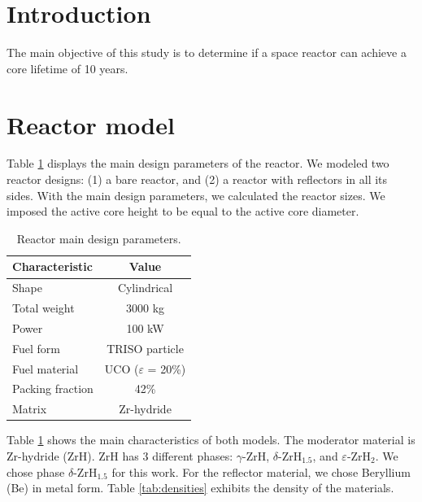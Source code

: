 \documentclass[11pt,letterpaper]{article}
\begin{document}
\section{Introduction}

The main objective of this study is to determine if a space reactor can achieve a core lifetime of 10 years.

\section{Reactor model}

Table \ref{tab:design} displays the main design parameters of the reactor.
We modeled two reactor designs: (1) a bare reactor, and (2) a reactor with reflectors in all its sides.
With the main design parameters, we calculated the reactor sizes.
We imposed the active core height to be equal to the active core diameter.

\begin{table}[htbp!]
	\centering
	\caption{Reactor main design parameters.}
	\label{tab:design}
	\begin{tabular}{@{}l c}
	\toprule
	Characteristic 		& Value			\\
	\midrule
	Shape 				& Cylindrical 	\\
	Total weight 		& 3000 kg		\\
	Power		 		& 100 kW		\\
	Fuel form			& TRISO particle 	\\
	Fuel material		& UCO ($\varepsilon$ = 20\%)	\\
	Packing fraction 	& 42\%			\\
	Matrix				& Zr-hydride	\\
	\bottomrule
	\end{tabular}
\end{table}

Table \ref{tab:design} shows the main characteristics of both models.
The moderator material is Zr-hydride (ZrH).
ZrH has 3 different phases: $\gamma$-ZrH, $\delta$-ZrH$_{1.5}$, and $\varepsilon$-ZrH$_{2}$.
We chose phase $\delta$-ZrH$_{1.5}$ for this work.
For the reflector material, we chose Beryllium (Be) in metal form.
Table \ref{tab:densities} exhibits the density of the materials.
\end{document}
